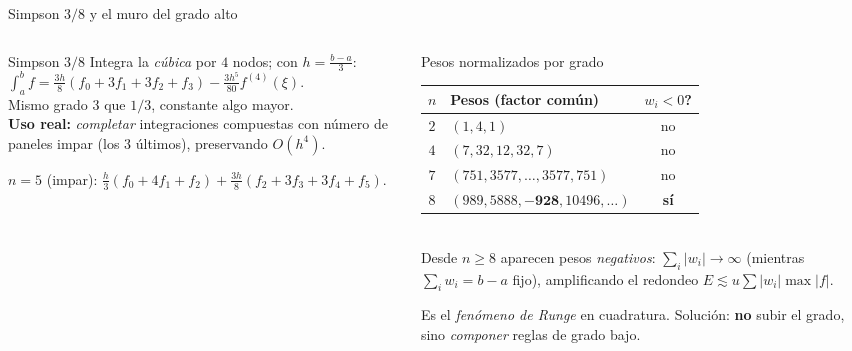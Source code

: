\documentclass[aspectratio=169,10pt]{beamer}
\begin{document}
\begin{frame}{Simpson $3/8$ y el muro del grado alto}
\begin{columns}[T]
\begin{column}{0.49\textwidth}
\begin{cardidea}{Simpson $3/8$}{\faSuperscript}
{\footnotesize Integra la \emph{cúbica} por $4$ nodos; con $h=\tfrac{b-a}{3}$:\\[0.5mm]
$\displaystyle\int_a^b f=\frac{3h}{8}(f_0+3f_1+3f_2+f_3)-\frac{3h^5}{80}f^{(4)}(\xi)$.\\[1.0mm]
Mismo grado $3$ que $1/3$, constante algo mayor.\\[0.6mm]
\textbf{Uso real:} \emph{completar} integraciones compuestas con número de paneles impar (los $3$ últimos), preservando $O(h^4)$.}
\end{cardidea}
\vspace{1mm}
\begin{cardnota}[\faInfoCircle]
{\footnotesize $n{=}5$ (impar): $\tfrac{h}{3}(f_0{+}4f_1{+}f_2)+\tfrac{3h}{8}(f_2{+}3f_3{+}3f_4{+}f_5)$.}
\end{cardnota}
\end{column}
\begin{column}{0.49\textwidth}
\begin{cardgear}{Pesos normalizados por grado}{\faTable}
\centering
{\scriptsize\renewcommand{\arraystretch}{1.3}\setlength{\tabcolsep}{3.5pt}
\begin{tabular}{c|l|c}
$n$ & Pesos (factor común) & $w_i<0$?\\\hline
$2$ & $(1,4,1)$ & no\\
$4$ & $(7,32,12,32,7)$ & no\\
$7$ & $(751,3577,\dots,3577,751)$ & no\\
$8$ & $(989,5888,\mathbf{-928},10496,\dots)$ & \textbf{sí}\\
\end{tabular}}\\[1.2mm]
{\footnotesize Desde $n{\ge}8$ aparecen pesos \emph{negativos}: $\sum_i|w_i|\to\infty$ (mientras $\sum_i w_i=b-a$ fijo), amplificando el redondeo $E\lesssim u\sum|w_i|\max|f|$.}
\end{cardgear}
\vspace{1mm}
\begin{cardnota}[\faExclamationTriangle]
{\footnotesize Es el \emph{fenómeno de Runge} en cuadratura. Solución: \textbf{no} subir el grado, sino \emph{componer} reglas de grado bajo.}
\end{cardnota}
\end{column}
\end{columns}
\end{frame}
\end{document}
